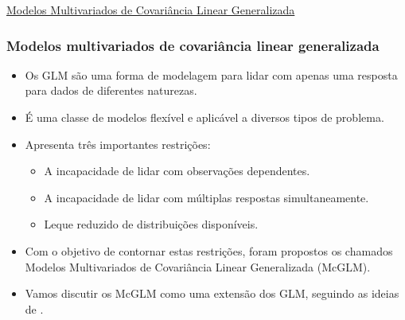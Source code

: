 \documentclass[10pt,
  aspectratio=169,
  serif,
  mathserif,
  professionalfont,
  compress,
  handout,
  ]{beamer}\usepackage[]{graphicx}\usepackage[]{color}
\begin{document}

\begin{frame}[c, allowframebreaks]

\begin{center}

  {\normalsize \href{https://lineu96.github.io/st/}{Modelos Multivariados de Covariância Linear Generalizada}}
  
\end{center}

\end{frame}


\begin{frame}
  \frametitle{Modelos multivariados de covariância linear generalizada}
  \begin{itemize}
    \itemsep 2ex
  
  \item Os GLM são uma forma de modelagem para lidar com apenas uma resposta para dados de diferentes naturezas.  
  
  \item É uma classe de modelos flexível e aplicável a diversos tipos de problema.  
  
  \item Apresenta três importantes restrições:
    \begin{itemize}
      \item A incapacidade de lidar com observações dependentes. 
      \item A incapacidade de lidar com múltiplas respostas simultaneamente.
      \item Leque reduzido de distribuições disponíveis. 
    \end{itemize}

  \item Com o objetivo de contornar estas restrições, foram propostos os chamados Modelos Multivariados de Covariância Linear Generalizada (McGLM).
  
  \item Vamos discutir os McGLM como uma extensão dos GLM, seguindo as ideias de \cite{Bonat16} . 
  
  \end{itemize}
\end{frame}

\end{document}
